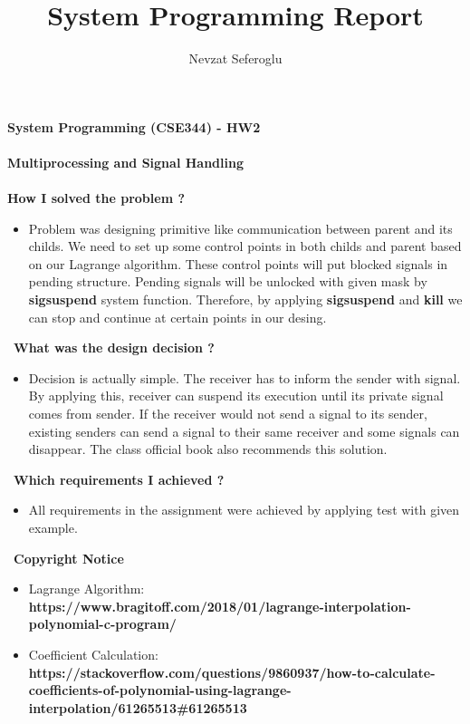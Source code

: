 \documentclass[12pt]{article}
\title{System Programming Report}
\author {Nevzat Seferoglu}
\begin{document}
\begin{center} \Large \end{center}
{\large \textbf{System Programming (CSE344) - HW2}} \\\\
{\large \textbf{Multiprocessing and Signal Handling}} \\\\
\textbf{How I solved the problem ?}
\begin{itemize}
    \item{Problem was designing primitive like communication between parent and its childs. We need to set up some control points in both childs and parent based on our Lagrange algorithm. These control points will put blocked signals in pending structure. Pending signals will be unlocked with given mask by \textbf{sigsuspend} system function. Therefore, by applying \textbf{sigsuspend} and \textbf{kill} we can stop and continue at certain points in our desing.}
\end{itemize}\
\textbf{What was the design decision ?}
\begin{itemize}
    \item{Decision is actually simple. The receiver has to inform the sender with signal. By applying this, receiver can suspend its execution until its private signal comes from sender. If the receiver would not send a signal to its sender, existing senders can send a signal to their same receiver and some signals can disappear. The class official book also recommends this solution.}
\end{itemize}\
\textbf{Which requirements I achieved ?}
\begin{itemize}
    \item{All requirements in the assignment were achieved by applying test with given example.}
\end{itemize}\
\textbf{Copyright Notice}
\begin{itemize}
    \item{Lagrange Algorithm:\\\textbf{https://www.bragitoff.com/2018/01/lagrange-interpolation-polynomial-c-program/}}
    \item{Coefficient Calculation:\\\textbf{https://stackoverflow.com/questions/9860937/how-to-calculate-coefficients-of-polynomial-using-lagrange-interpolation/61265513\#61265513}}
\end{itemize}\
\end{document}
